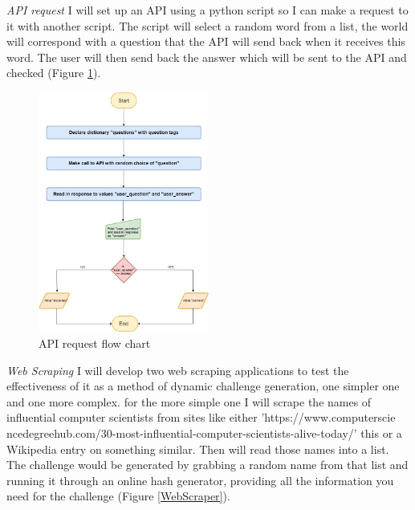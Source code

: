\documentclass[12pt,a4paper]{article}
\begin{document}
\emph{API request} 
I will set up an API using a python script so I can make a request to it with another script. The script will select a random word from a list, the world will correspond with a question that the API will send back when it receives this word. The user will then send back the answer which will be sent to the API and checked (Figure \ref{APIRequest}).   

\begin{figure}[h]
    \centering
    \includegraphics[width=0.5\textwidth]{Figs/API_request.png} 
    \caption{API request flow chart} 
    \label{APIRequest}
\end{figure}   


\emph{Web Scraping} 
I will develop two web scraping applications to test the effectiveness of it as a method of dynamic challenge generation, one simpler one and one more complex. for the more simple one I will scrape the names of influential computer scientists from sites like either 'https://www.computerscie
ncedegreehub.com/30-most-influential-computer-scientists-alive-today/' this or a Wikipedia entry on something similar. Then will read those names into a list. The challenge would be generated by grabbing a random name from that list and running it through an online hash generator, providing all the information you need for the challenge (Figure \ref{WebScraper}).   
\end{document}
